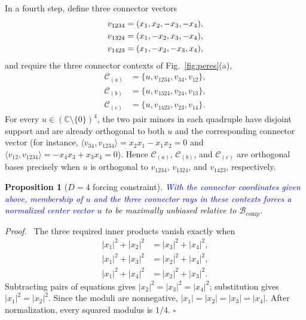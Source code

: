 \documentclass[%
  reprint,
  superscriptaddress,
  showkeys,
  amsmath,amssymb,
  aps,pra,
  longbibliography,
  floatfix,
  x11names
]{revtex4-2}
\DeclareRobustCommand{\chg}[1]{\textcolor{blue}{#1}}
\newtheorem{proposition}{Proposition}
\newenvironment{proof}{\par\noindent\textit{Proof.}\ }{\hfill$\square$\par}
\begin{document}
In a fourth step, define three connector vectors
\begin{align*}
v_{1234}&=(x_1,x_2,-x_3,-x_4),\\
v_{1324}&=(x_1,-x_2,x_3,-x_4),\\
v_{1423}&=(x_1,-x_2,-x_3,x_4)\chg{,}
\end{align*}
{\color{blue}and require the three connector contexts of Fig.~\ref{fig:peres}(a),
\begin{align*}
\mathcal{C}_{(a)}&=\{u,v_{1234},v_{34},v_{12}\},\\
\mathcal{C}_{(b)}&=\{u,v_{1324},v_{24},v_{13}\},\\
\mathcal{C}_{(c)}&=\{u,v_{1423},v_{23},v_{14}\}.
\end{align*}
For every $u\in(\mathbb{C}\setminus\{0\})^4$, the two pair minors in each quadruple have disjoint support and are already orthogonal to both $u$ and the corresponding connector vector (for instance, $\langle v_{34},v_{1234}\rangle=x_2x_1-x_1x_2=0$ and $\langle v_{12},v_{1234}\rangle=-x_4x_3+x_3x_4=0$).  Hence $\mathcal{C}_{(a)}$, $\mathcal{C}_{(b)}$, and $\mathcal{C}_{(c)}$ are orthogonal bases precisely when $u$ is orthogonal to $v_{1234}$, $v_{1324}$, and $v_{1423}$, respectively.}

\begin{proposition}[$D=4$ forcing constraint]
\label{prop:D4forcing}
\chg{With the connector coordinates given above, membership of $u$ and the three connector rays in these contexts forces a normalized center vector $u$} to be maximally unbiased relative to $\mathcal{B}_{\mathrm{comp}}$.
\end{proposition}

\begin{proof}
The three required inner products vanish exactly when
\begin{align}
|x_1|^2+|x_2|^2&=|x_3|^2+|x_4|^2, \label{eq:D4a}\\
|x_1|^2+|x_3|^2&=|x_2|^2+|x_4|^2, \label{eq:D4b}\\
|x_1|^2+|x_4|^2&=|x_2|^2+|x_3|^2. \label{eq:D4c}
\end{align}
Subtracting pairs of equations gives $|x_2|^2=|x_3|^2=|x_4|^2$; substitution gives $|x_1|^2=|x_2|^2$.  Since the moduli are nonnegative, \ensuremath{|x_1|=|x_2|=|x_3|=|x_4|}.  After normalization, every squared modulus is $1/4$.
\end{proof}
\end{document}
